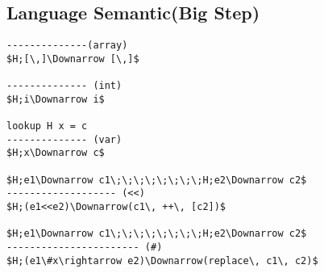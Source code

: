 \documentclass[11pt, a4paper]{article}
\begin{document}
\subsection*{Language Semantic(Big Step)}
\begin{lstlisting}
--------------(array)
$H;[\,]\Downarrow [\,]$

-------------- (int)
$H;i\Downarrow i$

lookup H x = c
-------------- (var)
$H;x\Downarrow c$

$H;e1\Downarrow c1\;\;\;\;\;\;\;\;H;e2\Downarrow c2$
------------------- (<<)
$H;(e1<<e2)\Downarrow(c1\, ++\, [c2])$

$H;e1\Downarrow c1\;\;\;\;\;\;\;\;H;e2\Downarrow c2$
----------------------- (#)
$H;(e1\#x\rightarrow e2)\Downarrow(replace\, c1\, c2)$
\end{lstlisting}
\end{document}
